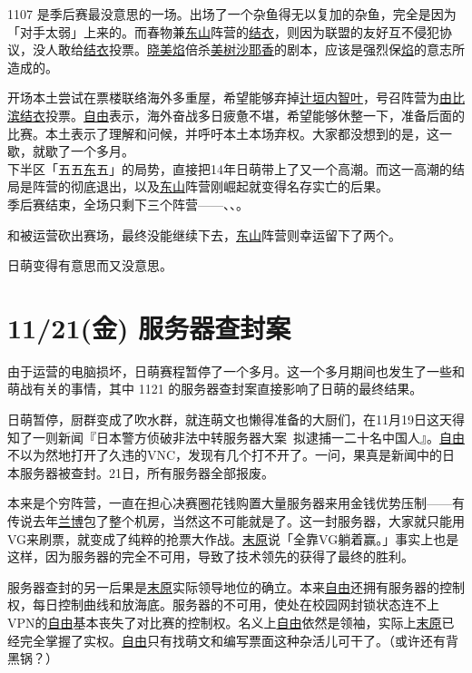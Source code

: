1107 是季后赛最没意思的一场。出场了一个杂鱼得无以复加的杂鱼，完全是因为「对手太弱」上来的。而春物兼\uline{东山}阵营的\uline{结衣}，则因为联盟的友好互不侵犯协议，没人敢给\uline{结衣}投票。\uline{晓美焰}倍杀\uline{美树沙耶香}的剧本，应该是强烈保\uline{焰}的意志所造成的。

开场本土尝试在票楼联络海外多重屋，希望能够弃掉\uline{辻垣内智叶}，号召阵营为\uline{由比滨结衣}投票。\uline{自由}表示，海外奋战多日疲惫不堪，希望能够休整一下，准备后面的比赛。本土表示了理解和问候，并呼吁本土本场弃权。大家都没想到的是，这一歇，就歇了一个多月。
\\

下半区「五五\uline{东}五」的局势，直接把14年日萌带上了又一个高潮。而这一高潮的结局是阵营的彻底退出，以及\uline{东山}阵营刚崛起就变得名存实亡的后果。
\\[1em]

季后赛结束，全场只剩下三个阵营——、、。

和被运营砍出赛场，最终没能继续下去，\uline{东山}阵营则幸运留下了两个。

日萌变得有意思而又没意思。
\clearpage
\section{11/21(金) 服务器查封案}

由于运营的电脑损坏，日萌赛程暂停了一个多月。这一个多月期间也发生了一些和萌战有关的事情，其中 1121 的服务器查封案直接影响了日萌的最终结果。

日萌暂停，厨群变成了吹水群，就连萌文也懒得准备的大厨们，在11月19日这天得知了一则新闻『日本警方侦破非法中转服务器大案~拟逮捕一二十名中国人』。\uline{自由}不以为然地打开了久违的VNC，发现有几个打不开了。一问，果真是新闻中的日本服务器被查封。21日，所有服务器全部报废。

本来是个穷阵营，一直在担心决赛圈花钱购置大量服务器来用金钱优势压制——有传说去年\uline{兰博}包了整个机房，当然这不可能就是了。这一封服务器，大家就只能用VG来刷票，就变成了纯粹的抢票大作战。\uline{末原}说「全靠VG躺着赢。」事实上也是这样，因为服务器的完全不可用，导致了技术领先的获得了最终的胜利。

服务器查封的另一后果是\uline{末原}实际领导地位的确立。本来\uline{自由}还拥有服务器的控制权，每日控制曲线和放海底。服务器的不可用，使处在校园网封锁状态连不上VPN的\uline{自由}基本丧失了对比赛的控制权。名义上\uline{自由}依然是领袖，实际上\uline{末原}已经完全掌握了实权。\uline{自由}只有找萌文和编写票面这种杂活儿可干了。（或许还有背黑锅？）

